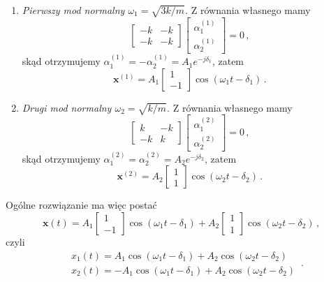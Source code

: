 \documentclass[../main.tex]{subfiles}
\begin{document}
        \begin{enumerate}[1.]
            \item \textit{Pierwszy mod normalny \(\omega_1=\sqrt{3k/m}\).} Z równania własnego mamy
            \begin{equation*}
                \begin{bmatrix}-k&-k\\-k&-k\end{bmatrix}\begin{bmatrix}\alpha_1^{(1)}\\\alpha_2^{(1)}\end{bmatrix}=0\,,
            \end{equation*}
            skąd otrzymujemy \(\alpha_1^{(1)}=-\alpha_2^{(1)}=A_1e^{-j\delta_1}\), zatem
            \begin{equation*}
                \mathbf{x}^{(1)}=A_1\begin{bmatrix}1\\-1\end{bmatrix}\cos(\omega_1t-\delta_1)\,.
            \end{equation*}
            \item \textit{Drugi mod normalny \(\omega_2=\sqrt{k/m}\).} Z równania własnego mamy
            \begin{equation*}
                \begin{bmatrix}k&-k\\-k&k\end{bmatrix}\begin{bmatrix}\alpha_1^{(2)}\\\alpha_2^{(2)}\end{bmatrix}=0\,,
            \end{equation*}
            skąd otrzymujemy \(\alpha_1^{(2)}=\alpha_2^{(2)}=A_2e^{-j\delta_2}\), zatem
            \begin{equation*}
                \mathbf{x}^{(2)}=A_2\begin{bmatrix}1\\1\end{bmatrix}\cos(\omega_2t-\delta_2)\,.
            \end{equation*}
        \end{enumerate}
        Ogólne rozwiązanie ma więc postać
        \begin{equation*}
            \mathbf{x}(t)=A_1\begin{bmatrix}1\\-1\end{bmatrix}\cos(\omega_1t-\delta_1)+A_2\begin{bmatrix}1\\1\end{bmatrix}\cos(\omega_2t-\delta_2)\,,
        \end{equation*}
        czyli
        \begin{equation*}
        \begin{split}
            &x_1(t)=A_1\cos(\omega_1t-\delta_1)+A_2\cos(\omega_2t-\delta_2)\\
            &x_2(t)=-A_1\cos(\omega_1t-\delta_1)+A_2\cos(\omega_2t-\delta_2)
        \end{split}\,.
        \end{equation*}
\end{document}
